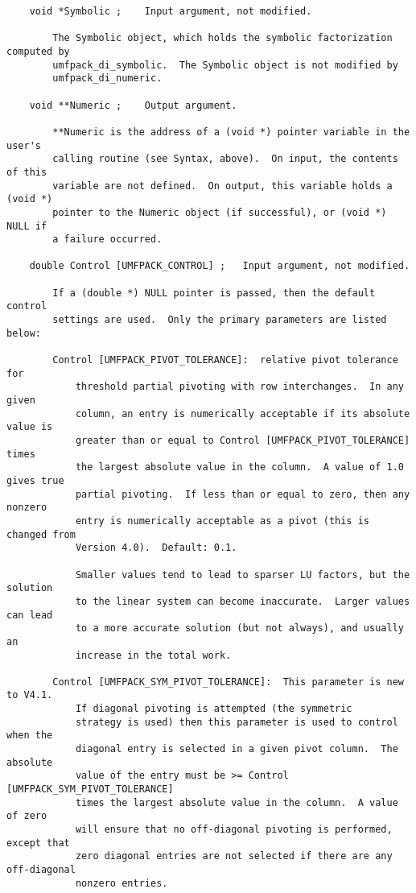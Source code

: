 \documentclass[11pt]{article}
\begin{document}
{\begin{verbatim}
    void *Symbolic ;    Input argument, not modified.

        The Symbolic object, which holds the symbolic factorization computed by
        umfpack_di_symbolic.  The Symbolic object is not modified by
        umfpack_di_numeric.

    void **Numeric ;    Output argument.

        **Numeric is the address of a (void *) pointer variable in the user's
        calling routine (see Syntax, above).  On input, the contents of this
        variable are not defined.  On output, this variable holds a (void *)
        pointer to the Numeric object (if successful), or (void *) NULL if
        a failure occurred.

    double Control [UMFPACK_CONTROL] ;   Input argument, not modified.

        If a (double *) NULL pointer is passed, then the default control
        settings are used.  Only the primary parameters are listed below:

        Control [UMFPACK_PIVOT_TOLERANCE]:  relative pivot tolerance for
            threshold partial pivoting with row interchanges.  In any given
            column, an entry is numerically acceptable if its absolute value is
            greater than or equal to Control [UMFPACK_PIVOT_TOLERANCE] times
            the largest absolute value in the column.  A value of 1.0 gives true
            partial pivoting.  If less than or equal to zero, then any nonzero
            entry is numerically acceptable as a pivot (this is changed from
            Version 4.0).  Default: 0.1.

            Smaller values tend to lead to sparser LU factors, but the solution
            to the linear system can become inaccurate.  Larger values can lead
            to a more accurate solution (but not always), and usually an
            increase in the total work.

        Control [UMFPACK_SYM_PIVOT_TOLERANCE]:  This parameter is new to V4.1.
            If diagonal pivoting is attempted (the symmetric
            strategy is used) then this parameter is used to control when the
            diagonal entry is selected in a given pivot column.  The absolute
            value of the entry must be >= Control [UMFPACK_SYM_PIVOT_TOLERANCE]
            times the largest absolute value in the column.  A value of zero
            will ensure that no off-diagonal pivoting is performed, except that
            zero diagonal entries are not selected if there are any off-diagonal
            nonzero entries.


\end{verbatim}}
\end{document}
